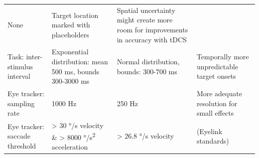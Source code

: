 \documentclass[11pt,english,]{memoir}
\begin{document}
\begin{longtable}[]{@{}llll@{}}
\begin{minipage}[t]{0.21\columnwidth}
None\strut
\end{minipage} & \begin{minipage}[t]{0.16\columnwidth}\raggedright
Target location marked with placeholders\strut
\end{minipage} & \begin{minipage}[t]{0.38\columnwidth}\raggedright
Spatial uncertainty might create more room for improvements in accuracy with tDCS\strut
\end{minipage}\tabularnewline
\begin{minipage}[t]{0.14\columnwidth}\raggedright
Task: inter-stimulus interval\strut
\end{minipage} & \begin{minipage}[t]{0.21\columnwidth}\raggedright
Exponential distribution: mean 500 ms, bounds 300-3000 ms\strut
\end{minipage} & \begin{minipage}[t]{0.16\columnwidth}\raggedright
Normal distribution, bounds: 300-700 ms\strut
\end{minipage} & \begin{minipage}[t]{0.38\columnwidth}\raggedright
Temporally more unpredictable target onsets\strut
\end{minipage}\tabularnewline
\begin{minipage}[t]{0.14\columnwidth}\raggedright
Eye tracker: sampling rate\strut
\end{minipage} & \begin{minipage}[t]{0.21\columnwidth}\raggedright
1000 Hz\strut
\end{minipage} & \begin{minipage}[t]{0.16\columnwidth}\raggedright
250 Hz\strut
\end{minipage} & \begin{minipage}[t]{0.38\columnwidth}\raggedright
More adequate resolution for small effects\strut
\end{minipage}\tabularnewline
\begin{minipage}[t]{0.14\columnwidth}\raggedright
Eye tracker: saccade threshold\strut
\end{minipage} & \begin{minipage}[t]{0.21\columnwidth}\raggedright
\textgreater{} 30 °/s velocity \& \textgreater{} 8000 °/s\textsuperscript{2} acceleration\strut
\end{minipage} & \begin{minipage}[t]{0.16\columnwidth}\raggedright
\textgreater{} 26.8 °/s velocity\strut
\end{minipage} & \begin{minipage}[t]{0.38\columnwidth}\raggedright
(Eyelink standards)\strut
\end{minipage}\tabularnewline
\bottomrule
\end{longtable}
\end{document}
